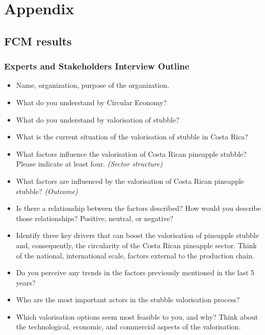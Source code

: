 \chapter{Appendix}

\renewcommand{\thesection}{A\arabic{section}}
\renewcommand\thefigure{A\arabic{section}.\arabic{figure}}  
\renewcommand\thetable{A\arabic{section}.\arabic{table}}  

\section{FCM results}

\subsection{Experts and Stakeholders Interview Outline}
\label{interviewOutline}

\begin{itemize}

\item Name, organization, purpose of the organization.
\item What do you understand by Circular Economy?
\item What do you understand by valorisation of stubble?
\item What is the current situation of the valorisation of stubble in Costa Rica?
\item What factors influence the valorisation of Costa Rican pineapple stubble? Please indicate at least four. \textit{(Sector structure)}
\item What factors are influenced by the valorisation of Costa Rican pineapple stubble? \textit{(Outcome)}
\item Is there a relationship between the factors described? How would you describe those relationships? Positive, neutral, or negative?
\item Identify three key drivers that can boost the valorisation of pineapple stubble and, consequently, the circularity of the Costa Rican pineapple sector. Think of the national, international scale, factors external to the production chain.
\item Do you perceive any trends in the factors previously mentioned in the last 5 years?
\item Who are the most important actors in the stubble valorisation process?
\item Which valorisation options seem most feasible to you, and why? Think about the technological, economic, and commercial aspects of the valorisation.

\end{itemize}


